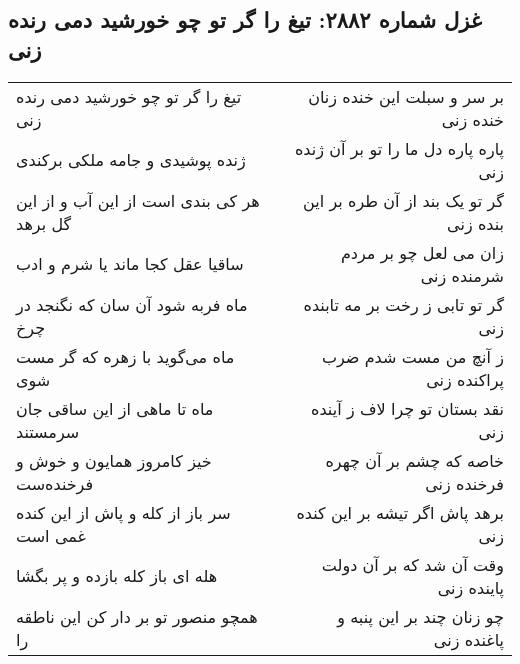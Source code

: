 \begin{center}
\section*{غزل شماره ۲۸۸۲: تیغ را گر تو چو خورشید دمی رنده زنی}
\label{sec:2882}
\begin{longtable}{l p{0.5cm} r}
تیغ را گر تو چو خورشید دمی رنده زنی
&&
بر سر و سبلت این خنده زنان خنده زنی
\\
ژنده پوشیدی و جامه ملکی برکندی
&&
پاره پاره دل ما را تو بر آن ژنده زنی
\\
هر کی بندی است از این آب و از این گل برهد
&&
گر تو یک بند از آن طره بر این بنده زنی
\\
ساقیا عقل کجا ماند یا شرم و ادب
&&
زان می لعل چو بر مردم شرمنده زنی
\\
ماه فربه شود آن سان که نگنجد در چرخ
&&
گر تو تابی ز رخت بر مه تابنده زنی
\\
ماه می‌گوید با زهره که گر مست شوی
&&
ز آنچ من مست شدم ضرب پراکنده زنی
\\
ماه تا ماهی از این ساقی جان سرمستند
&&
نقد بستان تو چرا لاف ز آینده زنی
\\
خیز کامروز همایون و خوش و فرخنده‌ست
&&
خاصه که چشم بر آن چهره فرخنده زنی
\\
سر باز از کله و پاش از این کنده غمی است
&&
برهد پاش اگر تیشه بر این کنده زنی
\\
هله ای باز کله بازده و پر بگشا
&&
وقت آن شد که بر آن دولت پاینده زنی
\\
همچو منصور تو بر دار کن این ناطقه را
&&
چو زنان چند بر این پنبه و پاغنده زنی
\\
\end{longtable}
\end{center}
